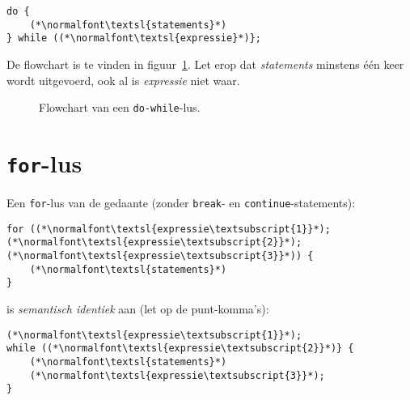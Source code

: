 \begin{lstlisting}[caption=Do-while-lus in C.]
do {
    (*\normalfont\textsl{statements}*)
} while ((*\normalfont\textsl{expressie}*)};
\end{lstlisting}

De flowchart is te vinden in figuur~\ref{fig:flodowhile}.
Let erop dat \textsl{statements} minstens \'e\'en keer wordt uitgevoerd, ook al is \textsl{expressie}
niet waar.

\begin{figure}[!ht]
\centering
{}
\caption{Flowchart van een \texttt{do-while}-lus.}
\label{fig:flodowhile}
\end{figure}


\newpage
\section{\texttt{for}-lus}

Een \texttt{for}-lus van de gedaante (zonder \texttt{break}- en \texttt{continue}-statements):
\newpage
\begin{lstlisting}[caption=\texttt{for}-lus in C.]
for ((*\normalfont\textsl{expressie\textsubscript{1}}*); (*\normalfont\textsl{expressie\textsubscript{2}}*); (*\normalfont\textsl{expressie\textsubscript{3}}*)) {
    (*\normalfont\textsl{statements}*)
}
\end{lstlisting}

is \textsl{semantisch identiek} aan (let op de punt-komma's):

\begin{lstlisting}[caption=\texttt{for}-lus herschreven als \texttt{while}-lus in C.]
(*\normalfont\textsl{expressie\textsubscript{1}}*);
while ((*\normalfont\textsl{expressie\textsubscript{2}}*)} {
    (*\normalfont\textsl{statements}*)
    (*\normalfont\textsl{expressie\textsubscript{3}}*);
}
\end{lstlisting}

